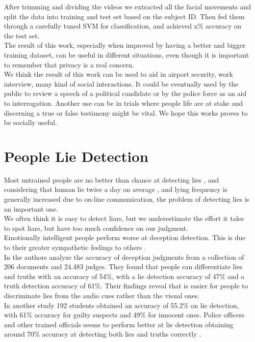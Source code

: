 After trimming and dividing the videos we extracted all the facial movements and split the data into training and test set based on the subject ID. Then fed them through a carefully tuned SVM for classification, and achieved x\% accuracy on the test set.\\
The result of this work, especially when improved by having a better and bigger training dataset, can be useful in different situations, even though it is important to remember that privacy is a real concern.\\
We think the result of this work can be used to aid in airport security, work interview, many kind of social interactions. It could be eventually used by the public to review a speech of a political candidate or by the police force as an aid to interrogation. Another use can be in trials where people life are at stake and discerning a true or false testimony might be vital. We hope this works proves to be socially useful.

\pagebreak

\section{People Lie Detection} \label{pplLieDet}

Most untrained people are no better than chance at detecting lies \cite{Porter2012SecretsAL},
and considering that human lie twice a day on average \cite{LyingEverydayLife}, and  lying frequency is generally increased  \cite{DigitalDeception} due to on-line communication, the problem of detecting lies is an important one. \\
We often think it is easy to detect liars, but we underestimate the effort it tales to spot liars, but have too much confidence on our judgment\cite{VrijDLD}. \\
Emotionally intelligent people perform worse at deception detection. This is due to their greater sympathetic feelings to others \cite{EmotionallyIntelligent}. \\
In \cite{BondDePauloAccuracy} the authors analyze the accuracy of deception judgments from a collection of 206 documents and 24.483 judges. They found that people can differentiate lies and truths with an accuracy of 54\%, with a lie detection accuracy of 47\% and a truth detection accuracy of 61\%. Their findings reveal that is easier for people to discriminate lies from the audio cues rather than the visual ones. \\
In another study \cite{HartwigGranhag} 192 students obtained an accuracy of 55.2\% on lie detection, with 61\% accuracy for guilty suspects and 49\% for innocent ones. Police officers and other trained officials seems to perform better at lie detection obtaining around 70\% accuracy at detecting both lies and truths correctly \cite{VrijPoliceDetect}.

